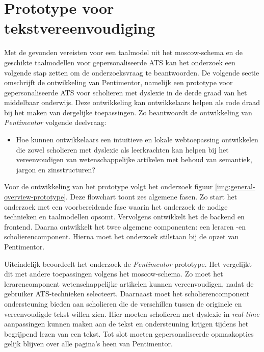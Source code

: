 \section{Prototype voor tekstvereenvoudiging}

Met de gevonden vereisten voor een taalmodel uit het moscow-schema en de geschikte taalmodellen voor gepersonaliseerde ATS kan het onderzoek een volgende stap zetten om de onderzoeksvraag te beantwoorden. De volgende sectie omschrijft de ontwikkeling van Pentimentor, namelijk een prototype voor gepersonaliseerde ATS voor scholieren met dyslexie in de derde graad van het middelbaar onderwijs. Deze ontwikkeling kan ontwikkelaars helpen als rode draad bij het maken van dergelijke toepassingen. Zo beantwoordt de ontwikkeling van \textit{Pentimentor} volgende deelvraag: 

\begin{itemize}
	\item Hoe kunnen ontwikkelaars een intuïtieve en lokale webtoepassing ontwikkelen die zowel scholieren met dyslexie als leerkrachten kan helpen bij het vereenvoudigen van wetenschappelijke artikelen met behoud van semantiek, jargon en zinsstructuren?
\end{itemize}

Voor de ontwikkeling van het prototype volgt het onderzoek figuur \ref{img:general-overview-prototype}. Deze flowchart toont zes algemene fasen. Zo start het onderzoek met een voorbereidende fase waarin het onderzoek de nodige technieken en taalmodellen opsomt. Vervolgens ontwikkelt het de backend en frontend. Daarna ontwikkelt het twee algemene componenten: een leraren -en scholierencomponent. Hierna moet het onderzoek stilstaan bij de opzet van Pentimentor. 

\medspace

Uiteindelijk beoordeelt het onderzoek de \textit{Pentimentor} prototype. Het vergelijkt dit met andere toepassingen volgens het moscow-schema. Zo moet het lerarencomponent wetenschappelijke artikelen kunnen vereenvoudigen, nadat de gebruiker ATS-technieken selecteert. Daarnaast moet het scholierencomponent ondersteuning bieden aan scholieren die de verschillen tussen de originele en vereenvoudigde tekst willen zien. Hier moeten scholieren met dyslexie in \textit{real-time} aanpassingen kunnen maken aan de tekst en ondersteuning krijgen tijdens het begrijpend lezen van een tekst. Tot slot moeten gepersonaliseerde opmaakopties gelijk blijven over alle pagina's heen van Pentimentor.


